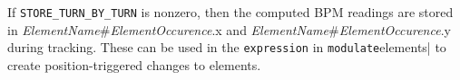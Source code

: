 If \verb|STORE_TURN_BY_TURN| is nonzero, then the computed BPM readings are stored in
{\em ElementName}\#{\em ElementOccurence}.x and {\em ElementName}\#{\em ElementOccurence}.y 
during tracking.
These can be used in the \verb|expression| in \verb|modulate|elements| to create position-triggered
changes to elements.
